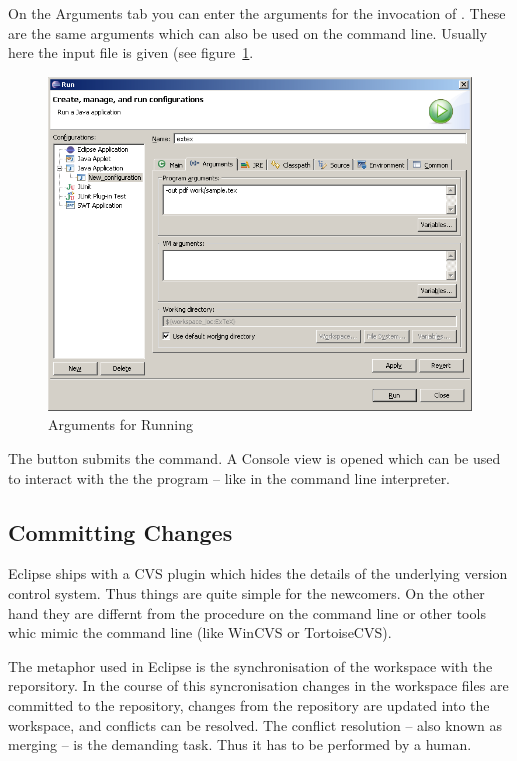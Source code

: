 On the Arguments tab you can enter the arguments for the invocation of
\ExTeX. These are the same arguments which can also be used on the
command line. Usually here the input file is given (see
figure~\ref{fig:eclipse-run-args}.
\begin{figure}[thp]
  \centering
  \includegraphics[scale=.4]{image/eclipse-run-args}
  \caption{Arguments for Running \ExTeX}\label{fig:eclipse-run-args}
\end{figure}

The  button submits the command. A Console view is opened
which can be used to interact with the the program -- like in the
command line interpreter.


\subsection{Committing Changes}

Eclipse ships with a CVS plugin which hides the details of the
underlying version control system. Thus things are quite simple for
the newcomers. On the other hand they are differnt from the procedure
on the command line or other tools whic mimic the command line (like
WinCVS or TortoiseCVS).

The metaphor used in Eclipse is the synchronisation of the workspace
with the reporsitory. In the course of this syncronisation changes in
the workspace files are committed to the repository, changes from the
repository are updated into the workspace, and conflicts can be
resolved. The conflict resolution -- also known as merging -- is the
demanding task. Thus it has to be performed by a human.

